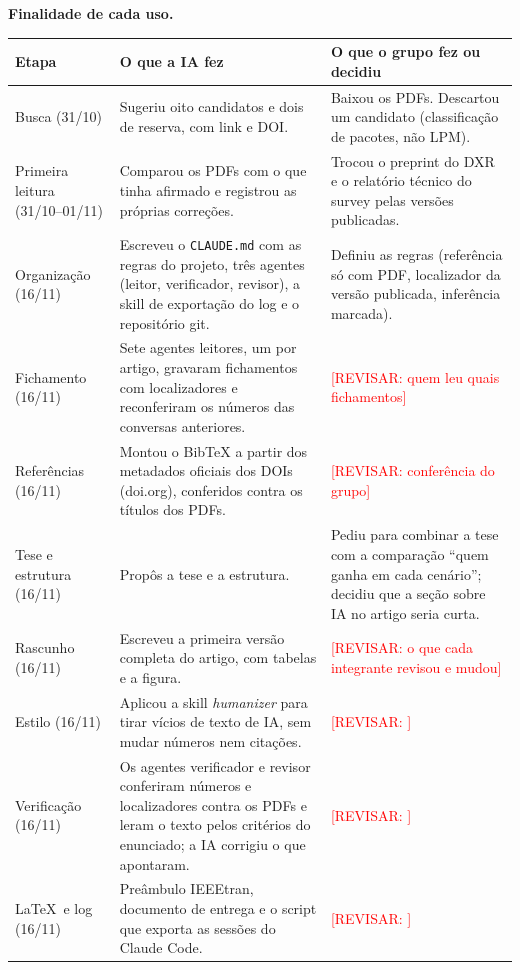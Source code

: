 \documentclass[11pt,a4paper]{article}
\newcommand{\revisar}[1]{\textcolor{red}{[REVISAR: #1]}}
\begin{document}
\textbf{Finalidade de cada uso.}

\begin{center}
\footnotesize
\begin{tabular}{>{\raggedright\arraybackslash}p{2.4cm} >{\raggedright\arraybackslash}p{6.6cm} >{\raggedright\arraybackslash}p{6.2cm}}
\hline
Etapa & O que a IA fez & O que o grupo fez ou decidiu \\
\hline
Busca (31/10) & Sugeriu oito candidatos e dois de reserva, com link e DOI. & Baixou os PDFs. Descartou um candidato (classificação de pacotes, não LPM). \\
Primeira leitura (31/10--01/11) & Comparou os PDFs com o que tinha afirmado e registrou as próprias correções. & Trocou o preprint do DXR e o relatório técnico do survey pelas versões publicadas. \\
Organização (16/11) & Escreveu o \texttt{CLAUDE.md} com as regras do projeto, três agentes (leitor, verificador, revisor), a skill de exportação do log e o repositório git. & Definiu as regras (referência só com PDF, localizador da versão publicada, inferência marcada). \\
Fichamento (16/11) & Sete agentes leitores, um por artigo, gravaram fichamentos com localizadores e reconferiram os números das conversas anteriores. & \revisar{quem leu quais fichamentos} \\
Referências (16/11) & Montou o BibTeX a partir dos metadados oficiais dos DOIs (doi.org), conferidos contra os títulos dos PDFs. & \revisar{conferência do grupo} \\
Tese e estrutura (16/11) & Propôs a tese e a estrutura. & Pediu para combinar a tese com a comparação ``quem ganha em cada cenário''; decidiu que a seção sobre IA no artigo seria curta. \\
Rascunho (16/11) & Escreveu a primeira versão completa do artigo, com tabelas e a figura. & \revisar{o que cada integrante revisou e mudou} \\
Estilo (16/11) & Aplicou a skill \textit{humanizer} para tirar vícios de texto de IA, sem mudar números nem citações. & \revisar{} \\
Verificação (16/11) & Os agentes verificador e revisor conferiram números e localizadores contra os PDFs e leram o texto pelos critérios do enunciado; a IA corrigiu o que apontaram. & \revisar{} \\
\LaTeX\ e log (16/11) & Preâmbulo IEEEtran, documento de entrega e o script que exporta as sessões do Claude Code. & \revisar{} \\
\hline
\end{tabular}
\end{center}
\end{document}
